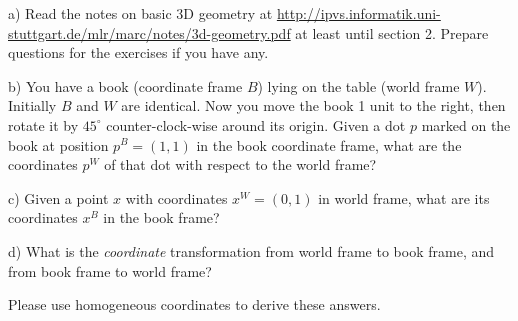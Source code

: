 

\renewcommand{\course}{Robotics}
\renewcommand{\coursepicture}{roboticsLecture}
\renewcommand{\coursedate}{Winter 2014}
\renewcommand{\exnum}{2}

\exercises



a) Read the notes on basic 3D geometry at
{\tiny\url{http://ipvs.informatik.uni-stuttgart.de/mlr/marc/notes/3d-geometry.pdf}} at
least until section 2. Prepare questions for the exercises if you have any.

b) You have a book (coordinate frame $B$) lying on the table (world
frame $W$). Initially $B$ and $W$ are identical. Now you move the book 1
unit to the right, then rotate it by $45^\circ$ counter-clock-wise
around its origin. Given a dot $p$ marked on the book at position
$p^B=(1,1)$ in the book coordinate frame, what are the coordinates
$p^W$ of that dot with respect to the world frame?

c) Given a point $x$ with coordinates $x^W=(0,1)$ in world
frame, what are its coordinates $x^B$ in the book frame?

d) What is the \emph{coordinate} transformation from world frame to book
frame, and from book frame to world frame?

Please use homogeneous coordinates to derive these answers.

